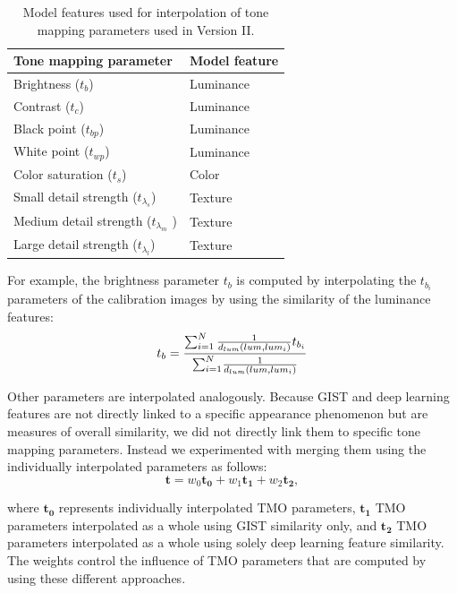 \begin{table}
\caption{Model features used for interpolation of tone mapping parameters used in Version II.}
\centering
\begin{tabular}{l | l}
\label{tab:feature_mapping}
\textbf{Tone mapping parameter} & \textbf{Model feature}\\
\hline
Brightness ($t_b$) & Luminance \\
Contrast ($t_c$) & Luminance \\
Black point ($t_{bp}$) & Luminance \\
White point ($t_{wp}$) & Luminance \\
Color saturation ($t_s$) & Color \\
Small detail strength ($t_{\lambda_s}$) & Texture \\
Medium detail strength ($t_{\lambda_m}$ ) & Texture \\
Large detail strength ($t_{\lambda_l}$) & Texture
\end{tabular}
\end{table}


For example, the brightness parameter $t_b$  is computed by interpolating the $t_{b_i}$ parameters of the calibration images by using the similarity of the luminance features:
\begin{equation}
   t_b = { {\sum_{i=1}^N { {1} \over {d_{lum} (lum, lum_i)} } t_{b_i} } \over {\sum_{i=1}^N} { {1} \over {d_{lum} (lum, lum_i)} } }
\end{equation}

Other parameters are interpolated analogously. Because GIST and deep learning features are not directly linked to a specific appearance phenomenon but are measures of overall similarity, we did not directly link them to specific tone mapping parameters. Instead we experimented with merging them using the individually interpolated parameters as follows:
\begin{equation}
   \mathbf{t} = w_0\mathbf{t_0} + w_1\mathbf{t_1} + w_2\mathbf{t_2}, 
\end{equation}

where $\mathbf{t_0}$ represents individually interpolated TMO parameters, $\mathbf{t_1}$ TMO parameters interpolated as a whole using GIST similarity only, and $\mathbf{t_2}$ TMO parameters interpolated as a whole using solely deep learning feature similarity. The weights control the influence of TMO parameters that are computed by using these different approaches.

